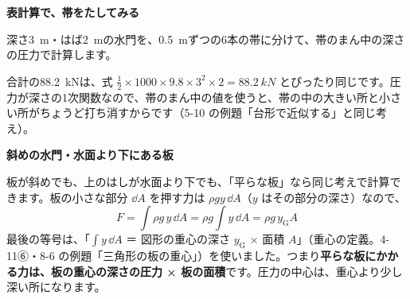 \noindent\textbf{表計算で、帯をたしてみる}\par\nobreak
深さ\qty{3}{m}・はば\qty{2}{m}の水門を、\qty{0.5}{m}ずつの6本の帯に分けて、帯のまん中の深さの圧力で計算します。
\begin{bkcenter}
\end{bkcenter}
合計の\qty{88.2}{kN}は、式 $\tfrac{1}{2}\times1000\times9.8\times3^2\times2=\qty{88.2}{kN}$ とぴったり同じです。圧力が深さの1次関数なので、帯のまん中の値を使うと、帯の中の大きい所と小さい所がちょうど打ち消すからです（5-10 の例題「台形で近似する」と同じ考え）。

\noindent\textbf{斜めの水門・水面より下にある板}\par\nobreak
板が斜めでも、上のはしが水面より下でも、「平らな板」なら同じ考えで計算できます。板の小さな部分 $\dd A$ を押す力は $\rho gy\,\dd A$（$y$ はその部分の深さ）なので、
\[ F=\int\rho g\,y\,\dd A=\rho g\int y\,\dd A=\rho g\,y_{\mathrm{G}}A \]
最後の等号は、「$\int y\,\dd A$ ＝ 図形の重心の深さ $y_{\mathrm{G}}$ × 面積 $A$」（重心の定義。4-11⑥・8-6 の例題「三角形の板の重心」）を使いました。つまり\textbf{平らな板にかかる力は、板の重心の深さの圧力 × 板の面積}です。圧力の中心は、重心より少し深い所になります。
\begin{phflow}
\end{phflow}


